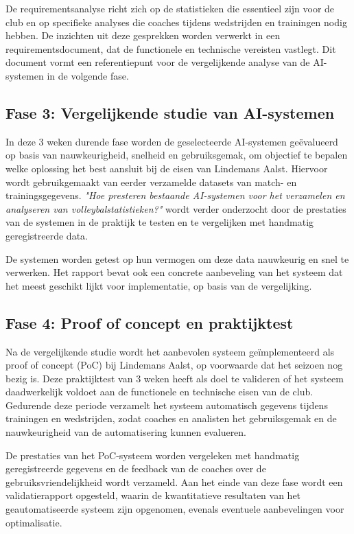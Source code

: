 De requirementsanalyse richt zich op de statistieken die essentieel zijn voor de club en op specifieke analyses die coaches tijdens wedstrijden en trainingen nodig hebben. De inzichten uit deze gesprekken worden verwerkt in een requirementsdocument, dat de functionele en technische vereisten vastlegt. Dit document vormt een referentiepunt voor de vergelijkende analyse van de AI-systemen in de volgende fase.
\subsection{Fase 3: Vergelijkende studie van AI-systemen}
In deze 3 weken durende fase worden de geselecteerde AI-systemen geëvalueerd op basis van nauwkeurigheid, snelheid en gebruiksgemak, om objectief te bepalen welke oplossing het best aansluit bij de eisen van Lindemans Aalst. Hiervoor wordt gebruikgemaakt van eerder verzamelde datasets van match- en trainingsgegevens. \textit{"Hoe presteren bestaande AI-systemen voor het verzamelen en analyseren van volleybalstatistieken?"} wordt verder onderzocht door de prestaties van de systemen in de praktijk te testen en te vergelijken met handmatig geregistreerde data.

De systemen worden getest op hun vermogen om deze data nauwkeurig en snel te verwerken. Het rapport bevat ook een concrete aanbeveling van het systeem dat het meest geschikt lijkt voor implementatie, op basis van de vergelijking.
\subsection{Fase 4: Proof of concept en praktijktest}
Na de vergelijkende studie wordt het aanbevolen systeem geïmplementeerd als proof of concept (PoC) bij Lindemans Aalst, op voorwaarde dat het seizoen nog bezig is. Deze praktijktest van 3 weken heeft als doel te valideren of het systeem daadwerkelijk voldoet aan de functionele en technische eisen van de club. Gedurende deze periode verzamelt het systeem automatisch gegevens tijdens trainingen en wedstrijden, zodat coaches en analisten het gebruiksgemak en de nauwkeurigheid van de automatisering kunnen evalueren.

De prestaties van het PoC-systeem worden vergeleken met handmatig geregistreerde gegevens en de feedback van de coaches over de gebruiksvriendelijkheid wordt verzameld. Aan het einde van deze fase wordt een validatierapport opgesteld, waarin de kwantitatieve resultaten van het geautomatiseerde systeem zijn opgenomen, evenals eventuele aanbevelingen voor optimalisatie.

